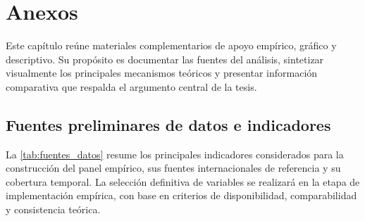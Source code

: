 \documentclass[../../PTFM.tex]{subfiles}
\begin{document}
	\appendix
	\chapter{Anexos}
	\label{chap:anexos}

	Este capítulo reúne materiales complementarios de apoyo empírico, gráfico y descriptivo. Su propósito es documentar las fuentes del análisis, sintetizar visualmente los principales mecanismos teóricos y presentar información comparativa que respalda el argumento central de la tesis.

	\section{Fuentes preliminares de datos e indicadores}
	\label{sec:fuentes}

	La \autoref{tab:fuentes_datos} resume los principales indicadores considerados para la construcción del panel empírico, sus fuentes internacionales de referencia y su cobertura temporal. La selección definitiva de variables se realizará en la etapa de implementación empírica, con base en criterios de disponibilidad, comparabilidad y consistencia teórica.

	\renewcommand{\arraystretch}{1.15}
	\setlength{\tabcolsep}{3pt}
\end{document}
